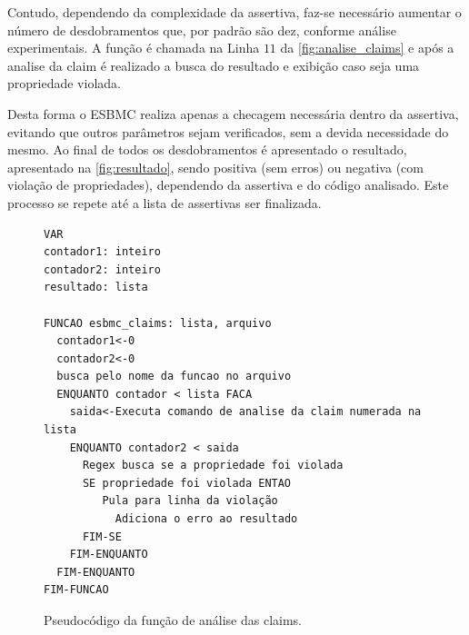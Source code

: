 \par
Contudo, dependendo da complexidade da assertiva, faz-se necessário aumentar o número de desdobramentos que, por padrão são dez, conforme análise experimentais. A função é chamada na Linha $11$ da \autoref{fig:analise_claims} e após a analise da claim é realizado a busca do resultado e exibição caso seja uma propriedade violada.

\par
Desta forma o ESBMC realiza apenas a checagem necessária dentro da assertiva, evitando que outros parâmetros sejam verificados, sem a devida necessidade do mesmo. Ao final de todos os desdobramentos é apresentado o resultado, apresentado na \autoref{fig:resultado}, sendo positiva (sem erros) ou negativa (com violação de propriedades), dependendo da assertiva e do código analisado. Este processo se repete até a lista de assertivas ser finalizada.
\begin{figure}[H]
\caption{\label{fig:analise_claims}Pseudocódigo da função de análise das claims.}
	\begin{center}
    \begin{minipage}{0.7\textwidth}
    \begin{lstlisting}       
VAR
contador1: inteiro
contador2: inteiro
resultado: lista

FUNCAO esbmc_claims: lista, arquivo
  contador1<-0
  contador2<-0
  busca pelo nome da funcao no arquivo
  ENQUANTO contador < lista FACA
    saida<-Executa comando de analise da claim numerada na lista
    ENQUANTO contador2 < saida
      Regex busca se a propriedade foi violada
      SE propriedade foi violada ENTAO
         Pula para linha da violação
	       Adiciona o erro ao resultado       
      FIM-SE  
    FIM-ENQUANTO
  FIM-ENQUANTO
FIM-FUNCAO
    \end{lstlisting}
    \end{minipage}
	\end{center}
\end{figure}

